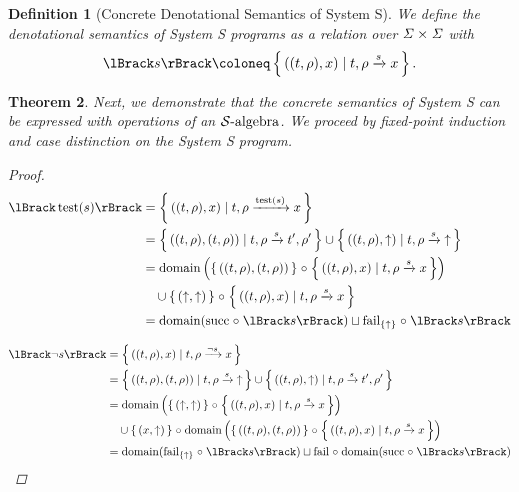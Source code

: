 \documentclass{article}
\newtheorem{theorem}{Theorem}
\newtheorem{definition}[theorem]{Definition}
\newcommand{\fail}{\ensuremath \text{$\uparrow$}}
\newcommand{\test}[1]{\ensuremath \operatorname{test}(#1)}
\newcommand{\transform}[5]{#1, #2 \xrightarrow{#3} #4, #5}
\newcommand{\transformx}[4]{#1, #2 \xrightarrow{#3} #4}
\newcommand{\transformfail}[3]{#1, #2 \xrightarrow{#3} \fail}
\newcommand{\sem}[1]{\ensuremath \lBrack #1 \rBrack}
\newcommand{\State}{\ensuremath \mathit{\Sigma} }
\newcommand{\setbuild}[2]{\ensuremath \left\{\, #1 \mid #2 \,\right\}}
\newcommand{\setbuildc}[1]{\ensuremath \left\{\, #1 \,\right\}}
\newcommand{\SAlgebra}{\ensuremath \mathcal{S}\text{-algebra}}
\newcommand{\domain}{\ensuremath \operatorname{domain}}
\newcommand{\lfail}{\ensuremath \operatorname{fail}}
\newcommand{\lsucc}{\ensuremath \operatorname{succ}}
\newcommand{\comp}{\ensuremath \mathrel{\circ}}
\begin{document}
\begin{definition}[Concrete Denotational Semantics of System S] \normalfont
  We define the denotational semantics of System S programs as a relation over $\State \times \State$ with \[\sem{s} \coloneq \setbuild{((t,\rho),x)}{\transformx{t}{\rho}{s}{x}}.\]
\end{definition}

\begin{theorem} \normalfont
  Next, we demonstrate that the concrete semantics of System S can be expressed with operations of an $\SAlgebra$. We proceed by fixed-point induction and case distinction on the System S program.
\begin{proof}

\begin{align*}
  \sem{\test{s}}
     &= \setbuild{((t,\rho),x)}{\transformx{t}{\rho}{\test{s}}{x}} \\
     &= \setbuild{((t,\rho),(t,\rho))}{\transform{t}{\rho}{s}{t'}{\rho'}} \cup
        \setbuild{((t,\rho),\fail)}{\transformfail{t}{\rho}{s}} \\
     &= \domain\left(\setbuildc{((t,\rho),(t,\rho))} \comp \setbuild{((t,\rho),x)}{\transformx{t}{\rho}{s}{x}}\right) \\
     &\quad \cup \setbuildc{ (\fail,\fail)} \comp \setbuild{((t,\rho),x)}{\transformx{t}{\rho}{s}{x}} \\
     &= \domain(\lsucc \comp \sem{s}) \sqcup \lfail_{\{\fail\}} \comp \sem{s}
\end{align*}

\begin{align*}
  \sem{\neg{s}}
    &= \setbuild{((t,\rho),x)}{\transformx{t}{\rho}{\neg{s}}{x}} \\
    &= \setbuild{((t,\rho),(t,\rho))}{\transformfail{t}{\rho}{s}} \cup \setbuild{((t,\rho),\fail)}{\transform{t}{\rho}{s}{t'}{\rho'}} \\
    &= \domain\left(\setbuildc{(\fail,\fail)} \comp \setbuild{((t,\rho),x)}{\transformx{t}{\rho}{s}{x}}\right) \\
    &\quad \cup \setbuildc{(x,\fail)} \comp \domain\left(\setbuildc{((t,\rho),(t,\rho))} \comp \setbuild{((t,\rho),x)}{\transformx{t}{\rho}{s}{x}}\right) \\
    &= \domain(\lfail_{\{\fail\}} \comp \sem{s}) \sqcup \lfail \comp \domain(\lsucc \comp \sem{s})
\end{align*}


\end{proof}
\end{theorem}
\end{document}
